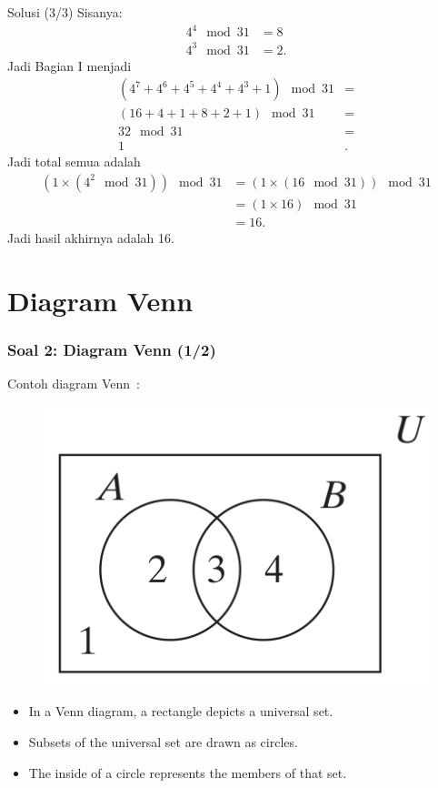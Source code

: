\documentclass[english,t]{beamer}
\begin{document}
\begin{frame}{Solusi (3/3)}
	Sisanya:
	\begin{align*}
		4^4 \mod 31 &= 8 \\
		4^3 \mod 31 &= 2.                        
	\end{align*}	
	Jadi Bagian I menjadi
	\begin{align*}
		(4^7 + 4^6 + 4^5 +4^4 +4^3 + 1) \mod 31 &= \\
		(16 + 4 + 1 + 8 + 2 + 1) \mod 31 &=  \\
		32 \mod 31 &= \\
		1 &.
	\end{align*}
	Jadi total semua adalah
	\begin{align*}
			( 1 \times (4^2 \mod 31)) \mod 31 &= ( 1 \times (16 \mod 31)) \mod 31 \\
			                                  &= ( 1 \times 16 ) \mod 31 \\ 
			                                  &= 16.  
	\end{align*}	
	Jadi hasil akhirnya adalah 16.
\end{frame}

\section{Diagram Venn}
\begin{frame}
  \frametitle{Soal 2: Diagram Venn (1/2)} 
	Contoh diagram Venn~\citep{johnsonbaugh2009discrete}:
	\begin{figure}[!ht]
		\centering
		\includegraphics[scale=0.4]{images/diagram_venn}		
	\end{figure}
	\begin{itemize}
		\item<2-> In a Venn diagram, a rectangle depicts a universal set.
		\item<3-> Subsets of the universal set are drawn as circles.
		\item<4-> The inside of a circle represents the members of that set.
	\end{itemize}	
\end{frame}
\end{document}

